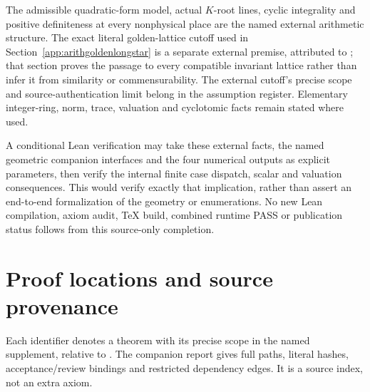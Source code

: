 \documentclass[11pt]{article}
\begin{document}
The admissible quadratic-form
model, actual \(K\)-root lines,
cyclic integrality and positive
definiteness at every nonphysical
place are the named external
arithmetic structure.
The exact literal golden-lattice
cutoff used in
Section~\ref{app:arithgoldenlongstar}
is a separate external premise,
attributed to
\cite{BugaenkoGolden1984};
that section proves the passage
to every compatible invariant
lattice rather than infer it
from similarity or commensurability.
The external cutoff's precise
scope and source-authentication
limit belong in the assumption
register.
Elementary integer-ring, norm,
trace, valuation and cyclotomic
facts remain stated where used.

A conditional Lean verification
may take these external facts,
the named geometric companion
interfaces and the four numerical
outputs as explicit parameters,
then verify the internal finite
case dispatch, scalar and valuation
consequences.
This would verify exactly that
implication, rather than assert
an end-to-end formalization of
the geometry or enumerations.
No new Lean compilation, axiom
audit, TeX build, combined runtime
PASS or publication status follows
from this source-only completion.

\section{Proof locations and source provenance}\label{app:sources}

Each identifier denotes a theorem with its precise scope in the
named supplement, relative to .
The companion report
gives full paths, literal hashes, acceptance/review bindings and
restricted dependency edges. It is a source index, not an extra axiom.
\end{document}
